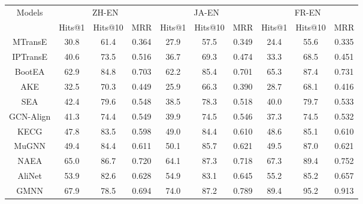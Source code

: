 \documentclass[letterpaper]{article} %
\begin{document}
\begin{table}[]
\centering \small
\begin{tabular}{c|ccc|ccc|ccc}
\hline
\multirow{2}{*}{Models}    & \multicolumn{3}{|c|}{ZH-EN} & \multicolumn{3}{|c|}{JA-EN}  & \multicolumn{3}{|c}{FR-EN} \\
\cline{2-10}
 & Hits@1    &  Hits@10    & MRR     & Hits@1    &  Hits@10    & MRR    & Hits@1    &  Hits@10    & MRR  \\
\hline
MTransE  \cite{chen2017multilingual}                  & 30.8        & 61.4    & 0.364     & 27.9        & 57.5        & 0.349     & 24.4    & 55.6    & 0.335    \\
IPTransE      \cite{hao2017Iterative}            & 40.6        & 73.5    & 0.516     & 36.7        & 69.3        & 0.474     & 33.3    & 68.5    & 0.451    \\
BootEA    \cite{sun2018bootstrapping}                 & 62.9        & 84.8    & 0.703     & 62.2        & 85.4        & 0.701     & 65.3    & 87.4    & 0.731    \\
AKE    \cite{lin2019guiding}                       & 32.5        & 70.3    & 0.449     & 25.9        & 66.3        & 0.390     & 28.7    & 68.1    & 0.416    \\
SEA     \cite{pei2019semi}                     & 42.4        & 79.6    & 0.548     & 38.5        & 78.3        & 0.518     & 40.0    & 79.7    & 0.533    \\
\hline
GCN-Align   \cite{wang2018cross}             & 41.3        & 74.4    & 0.549     & 39.9        & 74.5        & 0.546     & 37.3    & 74.5    & 0.532    \\
KECG      \cite{li2019semi}                & 47.8        & 83.5     & 0.598     & 49.0        & 84.4        & 0.610     & 48.6    & 85.1    & 0.610    \\
MuGNN   \cite{cao2019multi}                & 49.4        & 84.4     & 0.611     & 50.1        & 85.7        & 0.621     & 49.5    & 87.0    & 0.621    \\
NAEA      \cite{zhu2019neighborhood}                & 65.0        & 86.7     & 0.720     & 64.1        & 87.3        & 0.718     & 67.3    & 89.4    & 0.752    \\
AliNet     \cite{sun2020knowledge}                 & 53.9        & 82.6     & 0.628     & 54.9        & 83.1        & 0.645     & 55.2    & 85.2    & 0.657    \\
\hline
GMNN    \cite{xu2019cross}               & 67.9        & 78.5    & 0.694     & 74.0        & 87.2        & 0.789     & 89.4    & 95.2    & 0.913    \\

\end{tabular}
\end{table}
\end{document}
